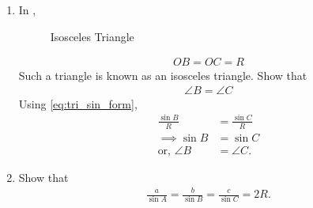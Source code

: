 \renewcommand{\theequation}{\theenumi}
\begin{enumerate}[label=\thesection.\arabic*.,ref=\thesection.\theenumi]
\item In 
	,	
\begin{figure}[!ht]
	\begin{center}
		\resizebox{\columnwidth}{!}{}
	\end{center}
	\caption{Isosceles Triangle}
	\label{fig:tri-isosc}	
\end{figure}
\begin{align}
	OB = OC=R
\end{align}
Such a triangle is known as an isosceles triangle.  Show that
\begin{align}
	\angle B = \angle C
\end{align}
\solution 
Using
\eqref{eq:tri_sin_form},
\begin{align}
	\frac{\sin B}{R} &= \frac{\sin C}{R}
	\\
\implies	{\sin B} &= {\sin C}
\\
	\text{or, } \angle B &= \angle C.
\end{align}
\item Show that 
\begin{align}
\label{eq:tri_crad_R}
\frac{a}{\sin A} = \frac{b}{\sin B} = \frac{c}{\sin C} = 2R.
\end{align}
%
\iffalse
\begin{figure}[!ht]
	\begin{center}
		

\end{center}
\end{figure}
\end{enumerate}
